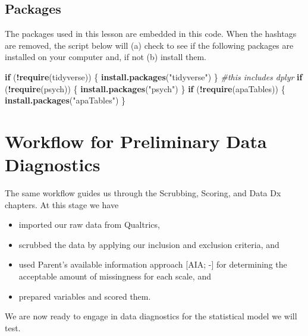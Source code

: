 \documentclass[
  11pt,
]{book}
\newenvironment{Shaded}{\begin{snugshade}}{\end{snugshade}}
\newcommand{\CommentTok}[1]{\textcolor[rgb]{0.37,0.37,0.37}{\textit{#1}}}
\newcommand{\ControlFlowTok}[1]{\textcolor[rgb]{0.27,0.27,0.27}{\textbf{#1}}}
\newcommand{\FunctionTok}[1]{\textcolor[rgb]{0.27,0.27,0.27}{\textbf{#1}}}
\newcommand{\NormalTok}[1]{#1}
\newcommand{\SpecialCharTok}[1]{\textcolor[rgb]{0.43,0.43,0.43}{\textbf{#1}}}
\newcommand{\StringTok}[1]{\textcolor[rgb]{0.5,0.5,0.5}{#1}}
\providecommand{\tightlist}{%
  \setlength{\itemsep}{0pt}\setlength{\parskip}{0pt}}
\begin{document}
\hypertarget{packages-2}{%
\subsection{Packages}\label{packages-2}}

The packages used in this lesson are embedded in this code. When the hashtags are removed, the script below will (a) check to see if the following packages are installed on your computer and, if not (b) install them.

\begin{Shaded}
\begin{Highlighting}[]
\ControlFlowTok{if}\NormalTok{ (}\SpecialCharTok{!}\FunctionTok{require}\NormalTok{(tidyverse)) \{}
    \FunctionTok{install.packages}\NormalTok{(}\StringTok{"tidyverse"}\NormalTok{)}
\NormalTok{\}  }\CommentTok{\#this includes dplyr}
\ControlFlowTok{if}\NormalTok{ (}\SpecialCharTok{!}\FunctionTok{require}\NormalTok{(psych)) \{}
    \FunctionTok{install.packages}\NormalTok{(}\StringTok{"psych"}\NormalTok{)}
\NormalTok{\}}
\ControlFlowTok{if}\NormalTok{ (}\SpecialCharTok{!}\FunctionTok{require}\NormalTok{(apaTables)) \{}
    \FunctionTok{install.packages}\NormalTok{(}\StringTok{"apaTables"}\NormalTok{)}
\NormalTok{\}}
\end{Highlighting}
\end{Shaded}

\hypertarget{workflow-for-preliminary-data-diagnostics}{%
\section{Workflow for Preliminary Data Diagnostics}\label{workflow-for-preliminary-data-diagnostics}}

The same workflow guides us through the Scrubbing, Scoring, and Data Dx chapters. At this stage we have

\begin{itemize}
\tightlist
\item
  imported our raw data from Qualtrics,
\item
  scrubbed the data by applying our inclusion and exclusion criteria, and
\item
  used Parent's available information approach {[}AIA; -\citet{parent_handling_2013}{]} for determining the acceptable amount of missingness for each scale, and
\item
  prepared variables and scored them.
\end{itemize}

We are now ready to engage in data diagnostics for the statistical model we will test.
\end{document}
